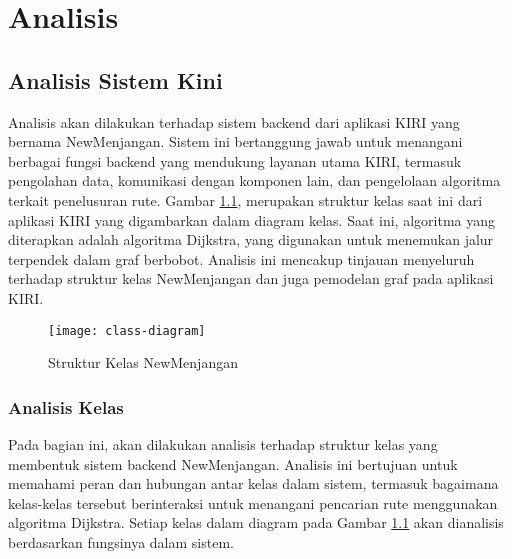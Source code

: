 \chapter{Analisis}
\label{chap:analisis}

\section{Analisis Sistem Kini}
\label{sec:sistemkini}
Analisis akan dilakukan terhadap sistem backend dari aplikasi KIRI yang bernama NewMenjangan. Sistem ini bertanggung jawab untuk menangani berbagai fungsi backend yang mendukung layanan utama KIRI, termasuk pengolahan data, komunikasi dengan komponen lain, dan pengelolaan algoritma terkait penelusuran rute. Gambar \ref{fig:strukturkelas}, merupakan struktur kelas saat ini dari aplikasi KIRI yang digambarkan dalam diagram kelas. Saat ini, algoritma yang diterapkan adalah algoritma Dijkstra, yang digunakan untuk menemukan jalur terpendek dalam graf berbobot. Analisis ini mencakup tinjauan menyeluruh terhadap struktur kelas NewMenjangan dan juga pemodelan graf pada aplikasi KIRI.
\begin{figure}[h] 
    \centering  
    \texttt{[image: class-diagram]}  
    \caption{Struktur Kelas NewMenjangan}
    \label{fig:strukturkelas} 
\end{figure}
\newpage
\subsection{Analisis Kelas}
Pada bagian ini, akan dilakukan analisis terhadap struktur kelas yang membentuk sistem backend NewMenjangan. Analisis ini bertujuan untuk memahami peran dan hubungan antar kelas dalam sistem, termasuk bagaimana kelas-kelas tersebut berinteraksi untuk menangani pencarian rute menggunakan algoritma Dijkstra. Setiap kelas dalam diagram pada Gambar \ref{fig:strukturkelas} akan dianalisis berdasarkan fungsinya dalam sistem.

